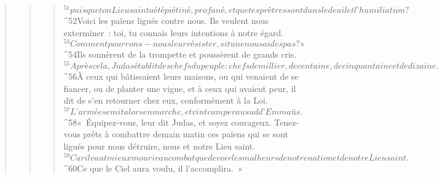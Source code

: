 \begin{verse}
\begin{verse}
\begin{verse}
${}^{51}puisque ton Lieu saint a été piétiné, profané, et que tes prêtres sont dans le deuil et l’humiliation ? 
${}^{52}Voici les païens ligués contre nous. Ils veulent nous exterminer : toi, tu connais leurs intentions à notre égard. 
${}^{53}Comment pourrons-nous leur résister, si tu ne nous aides pas ? » 
${}^{54}Ils sonnèrent de la trompette et poussèrent de grands cris.
${}^{55}Après cela, Judas établit des chefs du peuple : chefs de millier, de centaine, de cinquantaine et de dizaine. 
${}^{56}À ceux qui bâtissaient leurs maisons, ou qui venaient de se fiancer, ou de planter une vigne, et à ceux qui avaient peur, il dit de s’en retourner chez eux, conformément à la Loi. 
${}^{57}L’armée se mit alors en marche, et vint camper au sud d’Emmaüs. 
${}^{58}« Équipez-vous, leur dit Judas, et soyez courageux. Tenez-vous prêts à combattre demain matin ces païens qui se sont ligués pour nous détruire, nous et notre Lieu saint. 
${}^{59}Car il vaut mieux mourir au combat que de voir les malheurs de notre nation et de notre Lieu saint. 
${}^{60}Ce que le Ciel aura voulu, il l’accomplira. »
      

\end{verse}
\end{verse}
\end{verse}

